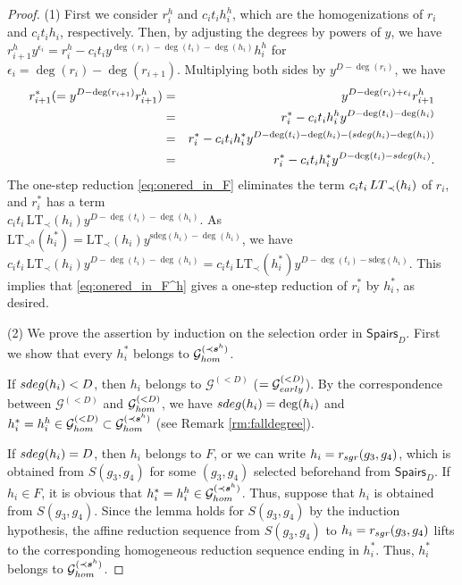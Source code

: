 \documentclass{article}
\theoremstyle{definition}
\theoremstyle{plain}
\theoremstyle{plain}
\theoremstyle{plain}
\theoremstyle{plain}
\numberwithin{equation}{subsection}
\begin{document}
\begin{proof}
(1) First we consider $r_i^h$ and $c_it_ih_i^h$, which are the homogenizations of $r_{i}$ and $c_it_ih_i$, respectively. 
Then, by adjusting the degrees by powers of $y$, we have $r_{i+1}^h y^{\epsilon_i}= r_i^h - c_i t_i y^{\deg(r_i)-\deg(t_i)-\deg(h_i)} h_i^h$ for $\epsilon_i=\deg(r_{i})-\deg(r_{i+1})$.
Multiplying both sides by $y^{D-\deg(r_i)}$, we have
\begin{eqnarray*}
r_{i+1}^*(=y^{D-\deg(r_{i+1})}r_{i+1}^h)  & = & y^{D-\deg(r_i)+\epsilon_i}r_{i+1}^{h} \\ 
& = & r_i^\ast - c_i t_i h_i^h y^{D-\deg(t_i)-\deg(h_i)}\\
& = & r_i^\ast - c_i t_i h_i^* y^{D-\deg(t_i)-\deg(h_i)-({\rm sdeg}(h_i)-\deg(h_i))}\\
& = & r_i^\ast - c_i t_i h_i^* y^{D-\deg(t_i)-{\rm sdeg}(h_i)}.\end{eqnarray*}
The one-step reduction \eqref{eq:onered_in_F} eliminates the term $c_i t_i\, {\rm LT}_\prec(h_i)$ of $r_i$, and $r_{i}^{\ast}$ has a term\\
$c_i t_i\, \mathrm{LT}_{\prec}(h_i) y^{D-\deg(t_i)-\deg(h_i)}$.
As $\mathrm{LT}_{\prec^h}(h_i^\ast) = \mathrm{LT}_{\prec}(h_i) y^{\mathrm{sdeg}(h_i)-\deg(h_i)}$, we have\\
$c_i t_i\, \mathrm{LT}_{\prec}(h_i) y^{D-\deg(t_i)-\deg(h_i)} = c_i t_i\, \mathrm{LT}_{\prec}(h_i^\ast) y^{D-\deg(t_i)-\mathrm{sdeg}(h_i)}$.
This implies that \eqref{eq:onered_in_F^h} gives a one-step reduction of $r_i^{\ast}$ by $h_i^{\ast}$, as desired.

\medskip
\noindent
(2) We prove the assertion by induction on the selection order in $\mathsf{Spairs}_D$. 
First we show that every $h_i^*$ belongs to $\mathcal{G}_{\rm hom}^{(\prec \bm{s}^h)}$. 

If ${\rm sdeg}(h_i)<D$, then $h_i$ belongs to $\mathcal{G}^{(<D)}$ ($=\mathcal{G}_{\rm early}^{(<D)}$). 
By the correspondence between $\mathcal{G}^{(<D)}$ and $\mathcal{G}_{\rm hom}^{(<D)}$, we have ${\rm sdeg}(h_i)=\deg(h_i)$ and $h_i^*=h_i^h\in \mathcal{G}_{\rm hom}^{(<D)} \subset \mathcal{G}^{(\prec \bm{s}^h)}_{\rm hom}$ (see Remark \ref{rm:falldegree}). 

If ${\rm sdeg}(h_i)=D$, then $h_i$ belongs to $F$, or we can write $h_i=r_{\rm sgr}(g_3,g_4)$, which is obtained from $S(g_3,g_4)$ for some $(g_3,g_4)$ selected beforehand from $\mathsf{Spairs}_D$.
If $h_i\in F$, it is obvious that $h_i^*=h_i^h\in \mathcal{G}_{\rm hom}^{(\prec \bm{s}^h)}$. 
Thus, suppose that $h_i$ is obtained from $S(g_3,g_4)$.
Since the lemma holds for $S(g_3,g_4)$ by the induction hypothesis, the affine reduction sequence from $S(g_3,g_4)$ to $h_i=r_{\rm sgr}(g_3,g_4)$ lifts to the corresponding homogeneous reduction sequence ending in $h_i^*$.
Thus, $h_i^*$ belongs to {$\mathcal{G}^{(\prec \bm{s}^h)}_{\rm hom}$}. 


\end{proof}
\end{document}
